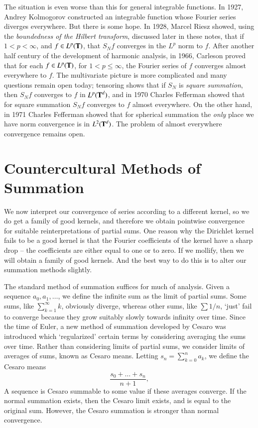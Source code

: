 The situation is even worse than this for general integrable functions. In 1927, Andrey Kolmogorov constructed an integrable function whose Fourier series diverges everywhere. But there is some hope. In 1928, Marcel Riesz showed, using the \emph{boundedness of the Hilbert transform}, discussed later in these notes, that if $1 < p < \infty$, and $f \in L^p(\operatorname{\mathbf{T}})$, that $S_N f$ converges in the $L^p$ norm to $f$. After another half century of the development of harmonic analysis, in 1966, Carleson proved that for each $f \in L^p(\operatorname{\mathbf{T}})$, for $1 < p \leq \infty$, the Fourier series of $f$ converges almost everywhere to $f$. The multivariate picture is more complicated and many questions remain open today; tensoring shows that if $S_N$ is \emph{square summation}, then $S_N f$ converges to $f$ in $L^p(\operatorname{\mathbf{T}}^d)$, and in 1970 Charles Fefferman showed that for square summation $S_N f$ converges to $f$ almost everywhere. On the other hand, in 1971 Charles Fefferman showed that for spherical summation the \emph{only} place we have norm convergence is in $L^2(\operatorname{\mathbf{T}}^d)$. The problem of almost everywhere convergence remains open.

\section{Countercultural Methods of Summation}

We now interpret our convergence of series according to a different kernel, so we do get a family of good kernels, and therefore we obtain pointwise convergence for suitable reinterpretations of partial sums. One reason why the Dirichlet kernel fails to be a good kernel is that the Fourier coefficients of the kernel have a sharp drop -- the coefficients are either equal to one or to zero. If we mollify, then we will obtain a family of good kernels. And the best way to do this is to alter our summation methods slightly.

The standard method of summation suffices for much of analysis. Given a sequence $a_0, a_1, \dots$, we define the infinite sum as the limit of partial sums. Some sums, like $\sum_{k = 1}^\infty k$, obviously diverge, whereas other sums, like $\sum 1/n$, `just' fail to converge because they grow suitably slowly towards infinity over time. Since the time of Euler, a new method of summation developed by Cesaro was introduced which `regularized' certain terms by considering averaging the sums over time. Rather than considering limits of partial sums, we consider limits of averages of sums, known as Cesaro means. Letting $s_n = \sum_{k = 0}^n a_k$, we define the Cesaro means
%
\[ \frac{s_0 + \dots + s_n}{n+1}, \]
%
A sequence is Cesaro summable to some value if these averages converge. If the normal summation exists, then the Cesaro limit exists, and is equal to the original sum. However, the Cesaro summation is stronger than normal convergence.

